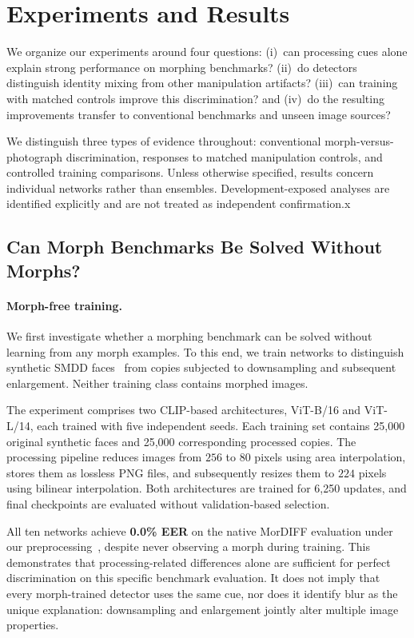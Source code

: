
\section{Experiments and Results}
\label{sec:results}

We organize our experiments around four questions:
(i)~can processing cues alone explain strong performance on
morphing benchmarks?
(ii)~do detectors distinguish identity mixing from other
manipulation artifacts?
(iii)~can training with matched controls improve this
discrimination?
and (iv)~do the resulting improvements transfer to
conventional benchmarks and unseen image sources?

We distinguish three types of evidence throughout:
conventional morph-versus-photograph discrimination,
responses to matched manipulation controls, and
controlled training comparisons. Unless otherwise
specified, results concern individual networks rather
than ensembles. Development-exposed analyses are
identified explicitly and are not treated as independent
confirmation.x

\subsection{Can Morph Benchmarks Be Solved Without Morphs?}
\label{sec:artifact_results}

\paragraph{Morph-free training.}
We first investigate whether a morphing benchmark can
be solved without learning from any morph examples.
To this end, we train networks to distinguish synthetic
SMDD faces~\cite{damer2022smdd} from copies subjected
to downsampling and subsequent enlargement.
Neither training class contains morphed images.

The experiment comprises two CLIP-based architectures,
ViT-B/16 and ViT-L/14, each trained with five independent
seeds. Each training set contains 25,000 original synthetic
faces and 25,000 corresponding processed copies.
The processing pipeline reduces images from $256$ to
$80$ pixels using area interpolation, stores them as
lossless PNG files, and subsequently resizes them to
$224$ pixels using bilinear interpolation.
Both architectures are trained for 6,250 updates,
and final checkpoints are evaluated without
validation-based selection.

All ten networks achieve
\textbf{0.0\% EER} on the native MorDIFF evaluation
under our preprocessing~\cite{damer2023mordiff},
despite never observing a morph during training.
This demonstrates that processing-related differences
alone are sufficient for perfect discrimination on this
specific benchmark evaluation. It does not imply that
every morph-trained detector uses the same cue, nor
does it identify blur as the unique explanation:
downsampling and enlargement jointly alter multiple
image properties.

